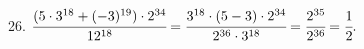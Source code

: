 26. $\cfrac{(5\cdot3^{18}+(-3)^{19})\cdot2^{34}}{12^{18}}=\cfrac{3^{18}\cdot(5-3)\cdot2^{34}}{2^{36}\cdot3^{18}}=\cfrac{2^{35}}{2^{36}}=\cfrac{1}{2}.$\\
